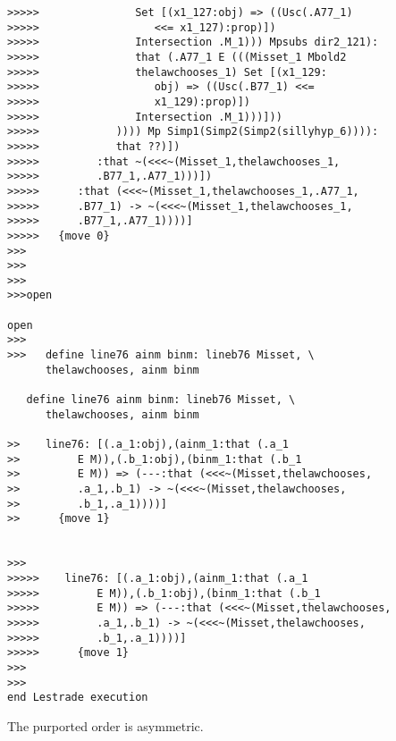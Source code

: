 \documentclass[12pt]{article}
\begin{document}
\begin{verbatim}
>>>>>               Set [(x1_127:obj) => ((Usc(.A77_1)
>>>>>                  <<= x1_127):prop)])
>>>>>               Intersection .M_1))) Mpsubs dir2_121):
>>>>>               that (.A77_1 E (((Misset_1 Mbold2
>>>>>               thelawchooses_1) Set [(x1_129:
>>>>>                  obj) => ((Usc(.B77_1) <<=
>>>>>                  x1_129):prop)])
>>>>>               Intersection .M_1)))]))
>>>>>            )))) Mp Simp1(Simp2(Simp2(sillyhyp_6)))):
>>>>>            that ??)])
>>>>>         :that ~(<<<~(Misset_1,thelawchooses_1,
>>>>>         .B77_1,.A77_1)))])
>>>>>      :that (<<<~(Misset_1,thelawchooses_1,.A77_1,
>>>>>      .B77_1) -> ~(<<<~(Misset_1,thelawchooses_1,
>>>>>      .B77_1,.A77_1))))]
>>>>>   {move 0}
>>>
>>>
>>>
>>>open

open
>>>
>>>   define line76 ainm binm: lineb76 Misset, \
      thelawchooses, ainm binm

   define line76 ainm binm: lineb76 Misset, \
      thelawchooses, ainm binm

>>    line76: [(.a_1:obj),(ainm_1:that (.a_1
>>         E M)),(.b_1:obj),(binm_1:that (.b_1
>>         E M)) => (---:that (<<<~(Misset,thelawchooses,
>>         .a_1,.b_1) -> ~(<<<~(Misset,thelawchooses,
>>         .b_1,.a_1))))]
>>      {move 1}


>>>
>>>>>    line76: [(.a_1:obj),(ainm_1:that (.a_1
>>>>>         E M)),(.b_1:obj),(binm_1:that (.b_1
>>>>>         E M)) => (---:that (<<<~(Misset,thelawchooses,
>>>>>         .a_1,.b_1) -> ~(<<<~(Misset,thelawchooses,
>>>>>         .b_1,.a_1))))]
>>>>>      {move 1}
>>>
>>>
end Lestrade execution
\end{verbatim}

The purported order is asymmetric.
\end{document}
